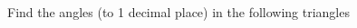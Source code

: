 \question Find the angles (to 1 decimal place) in the following triangles
\label{q:triangle_formulae_q02}
\begin{multicols}{3}
\end{multicols}
